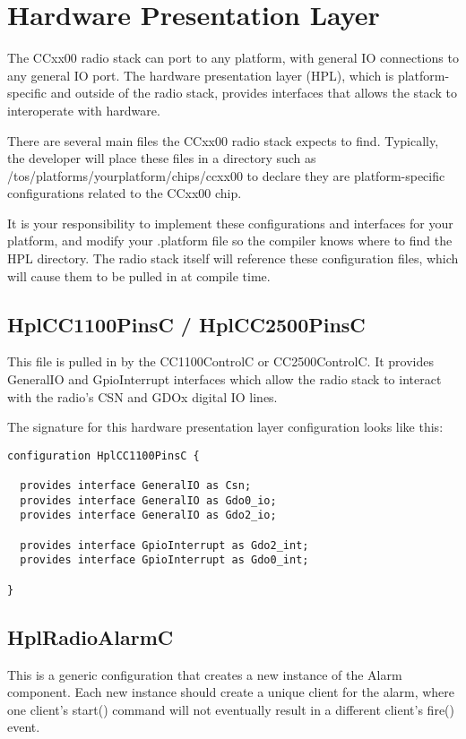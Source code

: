 \documentclass{article}
\begin{document}
\section{Hardware Presentation Layer}
\label{sec:HardwarePresentationLayer}

The CCxx00 radio stack can port to any platform, with general IO connections to any
general IO port.  The hardware presentation layer (HPL), which is platform-specific and outside
of the radio stack, provides interfaces that allows the stack to interoperate with hardware.

There are several main files the CCxx00 radio stack expects to find. Typically, the developer
will place these files in a directory such as /tos/platforms/yourplatform/chips/ccxx00
to declare they are platform-specific configurations related to the CCxx00 chip.

It is your responsibility to implement these configurations and interfaces for your platform,
and modify your .platform file so the compiler knows where to find the HPL directory.
The radio stack itself will reference these configuration files, which will cause them
to be pulled in at compile time.

\subsection{HplCC1100PinsC / HplCC2500PinsC}
This file is pulled in by the CC1100ControlC or CC2500ControlC.  It provides 
GeneralIO and GpioInterrupt interfaces which allow the radio stack to interact
with the radio's CSN and GDOx digital IO lines.

The signature for this hardware presentation layer configuration looks like this:

\begin{verbatim}
configuration HplCC1100PinsC {

  provides interface GeneralIO as Csn;
  provides interface GeneralIO as Gdo0_io;
  provides interface GeneralIO as Gdo2_io;
  
  provides interface GpioInterrupt as Gdo2_int;
  provides interface GpioInterrupt as Gdo0_int;
  
}
\end{verbatim}


\subsection{HplRadioAlarmC}
This is a generic configuration that creates a new instance of the Alarm component.
Each new instance should create a unique client for the alarm, where one client's 
start() command will not eventually result in a different client's fire() event.
\end{document}
